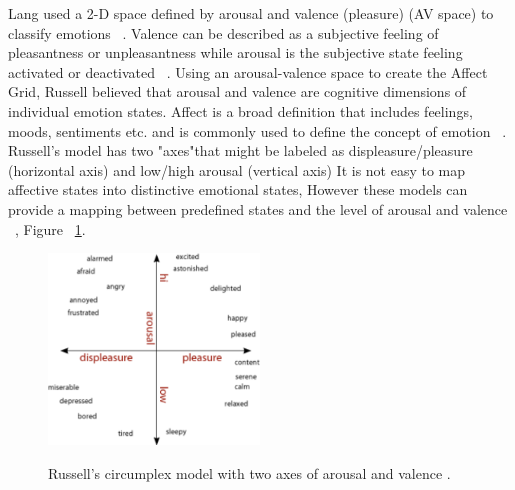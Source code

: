 Lang used a 2-D space defined by arousal and valence (pleasure) (AV space) to classify emotions ~\cite{lang1995emotion}. Valence can be described as a subjective feeling of pleasantness or unpleasantness while arousal is the subjective state feeling activated or deactivated ~\cite{barrett1998discrete}. Using an arousal-valence space to create the Affect Grid, Russell believed that arousal and valence are cognitive dimensions of individual emotion states. Affect is a broad definition that includes feelings, moods, sentiments etc. and is commonly used to define the concept of emotion ~\cite{picard2003affective}. Russell's model has two "axes"that might be labeled as displeasure/pleasure (horizontal axis) and low/high arousal (vertical axis) It is not easy to map affective states into distinctive emotional states, However these models can provide a mapping between predefined states and the level of arousal and valence ~\cite{zagalo2004story}, Figure ~\ref{fig:russelavspace}.

\begin{figure}[h!]
  \caption[Russell's arousal and valence model]
  {Russell's circumplex model with two axes of arousal and valence \footnotemark.}
  \centering
  \includegraphics[width=0.5\textwidth]{images/russell-av-space.pdf}
  \label{fig:russelavspace}
\end{figure}


